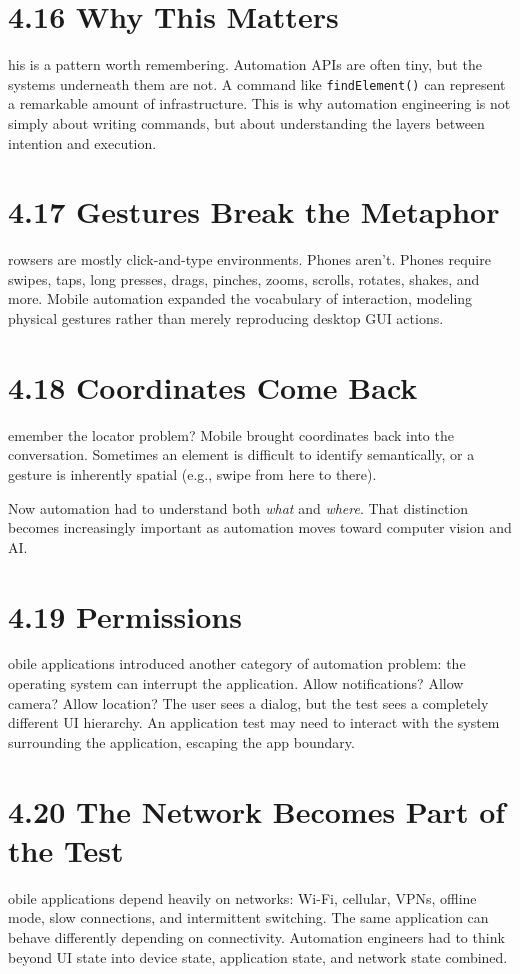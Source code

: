 \documentclass[11pt, a4paper, openany]{book}
\newcommand{\initialcap}[1]{{\fontfamily{lmss}\selectfont\huge\textbf{#1}}}
\begin{document}
\section{4.16 Why This Matters}
\noindent \initialcap{T}his is a pattern worth remembering. Automation APIs are often tiny, but the systems underneath them are not. A command like \texttt{findElement()} can represent a remarkable amount of infrastructure. This is why automation engineering is not simply about writing commands, but about understanding the layers between intention and execution.

\section{4.17 Gestures Break the Metaphor}
\noindent \initialcap{B}rowsers are mostly click-and-type environments. Phones aren't. Phones require swipes, taps, long presses, drags, pinches, zooms, scrolls, rotates, shakes, and more. Mobile automation expanded the vocabulary of interaction, modeling physical gestures rather than merely reproducing desktop GUI actions.

\section{4.18 Coordinates Come Back}
\noindent \initialcap{R}emember the locator problem? Mobile brought coordinates back into the conversation. Sometimes an element is difficult to identify semantically, or a gesture is inherently spatial (e.g., swipe from here to there). 

Now automation had to understand both \textit{what} and \textit{where}. That distinction becomes increasingly important as automation moves toward computer vision and AI.

\section{4.19 Permissions}
\noindent \initialcap{M}obile applications introduced another category of automation problem: the operating system can interrupt the application. Allow notifications? Allow camera? Allow location? The user sees a dialog, but the test sees a completely different UI hierarchy. An application test may need to interact with the system surrounding the application, escaping the app boundary.

\section{4.20 The Network Becomes Part of the Test}
\noindent \initialcap{M}obile applications depend heavily on networks: Wi-Fi, cellular, VPNs, offline mode, slow connections, and intermittent switching. The same application can behave differently depending on connectivity. Automation engineers had to think beyond UI state into device state, application state, and network state combined.
\end{document}
